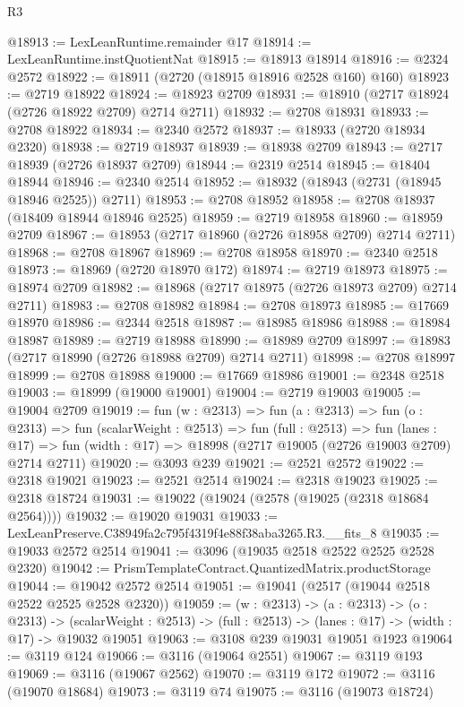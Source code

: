 \begin{lexlean}{R3}
\begin{coremodule}
@18913 := LexLeanRuntime.remainder @17
@18914 := LexLeanRuntime.instQuotientNat
@18915 := @18913 @18914
@18916 := @2324 @2572
@18922 := @18911 (@2720 (@18915 @18916 @2528 @160) @160)
@18923 := @2719 @18922
@18924 := @18923 @2709
@18931 := @18910 (@2717 @18924 (@2726 @18922 @2709) @2714 @2711)
@18932 := @2708 @18931
@18933 := @2708 @18922
@18934 := @2340 @2572
@18937 := @18933 (@2720 @18934 @2320)
@18938 := @2719 @18937
@18939 := @18938 @2709
@18943 := @2717 @18939 (@2726 @18937 @2709)
@18944 := @2319 @2514
@18945 := @18404 @18944
@18946 := @2340 @2514
@18952 := @18932 (@18943 (@2731 (@18945 @18946 @2525)) @2711)
@18953 := @2708 @18952
@18958 := @2708 @18937 (@18409 @18944 @18946 @2525)
@18959 := @2719 @18958
@18960 := @18959 @2709
@18967 := @18953 (@2717 @18960 (@2726 @18958 @2709) @2714 @2711)
@18968 := @2708 @18967
@18969 := @2708 @18958
@18970 := @2340 @2518
@18973 := @18969 (@2720 @18970 @172)
@18974 := @2719 @18973
@18975 := @18974 @2709
@18982 := @18968 (@2717 @18975 (@2726 @18973 @2709) @2714 @2711)
@18983 := @2708 @18982
@18984 := @2708 @18973
@18985 := @17669 @18970
@18986 := @2344 @2518
@18987 := @18985 @18986
@18988 := @18984 @18987
@18989 := @2719 @18988
@18990 := @18989 @2709
@18997 := @18983 (@2717 @18990 (@2726 @18988 @2709) @2714 @2711)
@18998 := @2708 @18997
@18999 := @2708 @18988
@19000 := @17669 @18986
@19001 := @2348 @2518
@19003 := @18999 (@19000 @19001)
@19004 := @2719 @19003
@19005 := @19004 @2709
@19019 := fun (w : @2313) =>
  fun (a : @2313) =>
  fun (o : @2313) =>
  fun (scalarWeight : @2513) =>
  fun (full : @2513) =>
  fun (lanes : @17) => fun (width : @17) => @18998 (@2717 @19005 (@2726 @19003 @2709) @2714 @2711)
@19020 := @3093 @239
@19021 := @2521 @2572
@19022 := @2318 @19021
@19023 := @2521 @2514
@19024 := @2318 @19023
@19025 := @2318 @18724
@19031 := @19022 (@19024 (@2578 (@19025 (@2318 @18684 @2564))))
@19032 := @19020 @19031
@19033 := LexLeanPreserve.C38949fa2c795f4319f4e88f38aba3265.R3.__fits_8
@19035 := @19033 @2572 @2514
@19041 := @3096 (@19035 @2518 @2522 @2525 @2528 @2320)
@19042 := PrismTemplateContract.QuantizedMatrix.productStorage
@19044 := @19042 @2572 @2514
@19051 := @19041 (@2517 (@19044 @2518 @2522 @2525 @2528 @2320))
@19059 := (w : @2313) ->
  (a : @2313) ->
  (o : @2313) ->
  (scalarWeight : @2513) -> (full : @2513) -> (lanes : @17) -> (width : @17) -> @19032 @19051
@19063 := @3108 @239 @19031 @19051 @1923
@19064 := @3119 @124
@19066 := @3116 (@19064 @2551)
@19067 := @3119 @193
@19069 := @3116 (@19067 @2562)
@19070 := @3119 @172
@19072 := @3116 (@19070 @18684)
@19073 := @3119 @74
@19075 := @3116 (@19073 @18724)

\end{coremodule}
\end{lexlean}

